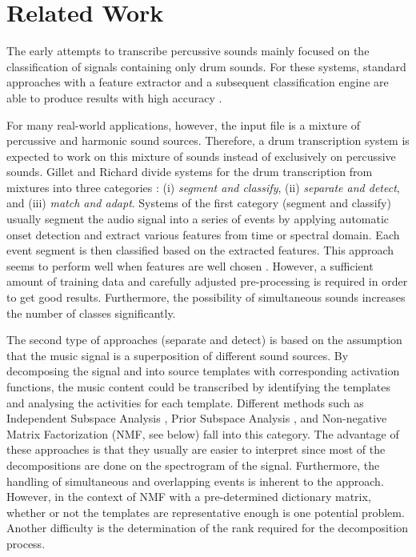 \documentclass{article}
\begin{document}
\section{Related Work}\label{sec:related works}

The early attempts to transcribe percussive sounds mainly focused on the classification of signals containing only drum sounds. For these systems, standard approaches with a feature extractor and a subsequent classification engine are able to produce results with high accuracy \cite{herrera_automatic_2002, herrera_automatic_2003}. 

For many real-world applications, however, the input file is a mixture of percussive and harmonic sound sources. Therefore, a drum transcription system is expected to work on this mixture of sounds instead of exclusively on percussive sounds. 
Gillet and Richard divide systems for the drum transcription from mixtures into three categories \cite{gillet_transcription_2008}: (i) \textit{segment and classify}, (ii) \textit{separate and detect}, and (iii) \textit{match and adapt}.  Systems of the first category (segment and classify) usually segment the audio signal into a series of events by applying automatic onset detection and extract various features from time or spectral domain. Each event segment is then classified based on the extracted features. 
This approach seems to perform well when features are well chosen \cite{gillet_automatic_2004, tanghe_algorithm_2005, dittmar_drum_2005}. However, a sufficient amount of training data and carefully adjusted pre-processing is required in order to get good results. Furthermore, the possibility of  simultaneous sounds increases the number of  classes significantly.

The second type of approaches (separate and detect) is based on the assumption that the music signal is a superposition of different sound sources. By decomposing the signal and into source templates with corresponding activation functions, the music content could be transcribed by identifying the templates and analysing the activities for each template. 
Different methods such as Independent Subspace Analysis \cite{fitzgerald_sub-band_2002}, Prior Subspace Analysis \cite{fitzgerald_drum_2003}, and Non-negative Matrix Factorization (NMF, see below) \cite{paulus_drum_2005,moreau_drum_2007,alves_drum_2009} fall into this category. The advantage of these approaches is that they usually are easier to interpret since most of the decompositions are done on the spectrogram of the signal. Furthermore, the handling of simultaneous and overlapping events is inherent to the approach. However, in the context of NMF with a pre-determined dictionary matrix, whether or not the templates are representative enough is one potential problem. Another difficulty is the determination of the rank required for the decomposition process.
\end{document}
